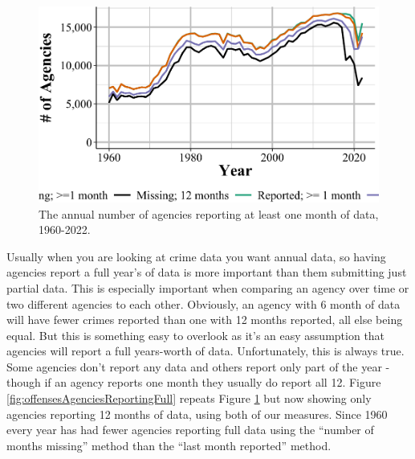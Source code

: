 \documentclass[
  12pt,
  openany]{book}
\begin{document}
\begin{figure}

{\centering \includegraphics[width=0.9\linewidth]{03_offenses_known_files/figure-latex/offensesAgenciesReporting-1} 

}

\caption{The annual number of agencies reporting at least one month of data, 1960-2022.}\label{fig:offensesAgenciesReporting}
\end{figure}

Usually when you are looking at crime data you want annual data, so having agencies report a full year's of data is more important than them submitting just partial data. This is especially important when comparing an agency over time or two different agencies to each other. Obviously, an agency with 6 month of data will have fewer crimes reported than one with 12 months reported, all else being equal. But this is something easy to overlook as it's an easy assumption that agencies will report a full years-worth of data. Unfortunately, this is always true. Some agencies don't report any data and others report only part of the year - though if an agency reports one month they usually do report all 12. Figure \ref{fig:offensesAgenciesReportingFull} repeats Figure \ref{fig:offensesAgenciesReporting} but now showing only agencies reporting 12 months of data, using both of our measures. Since 1960 every year has had fewer agencies reporting full data using the ``number of months missing'' method than the ``last month reported'' method.
\end{document}
